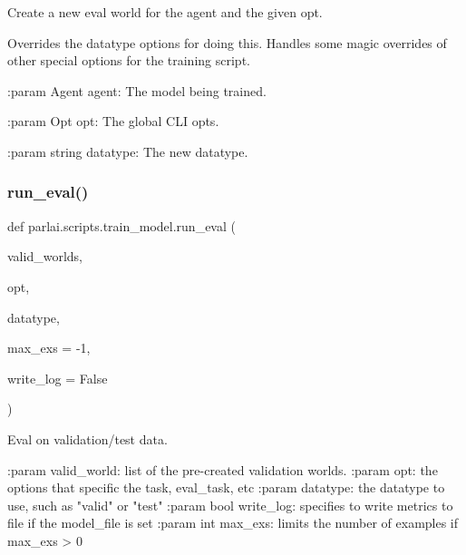 \begin{DoxyVerb}Create a new eval world for the agent and the given opt.

Overrides the datatype options for doing this.  Handles some magic
overrides of other special options for the training script.

:param Agent agent:
    The model being trained.

:param Opt opt:
    The global CLI opts.

:param string datatype:
    The new datatype.
\end{DoxyVerb}
 \mbox{\label{namespaceparlai_1_1scripts_1_1train__model_a496dfe3bf04da9b55d261b4c8d6229a7}} 
\subsubsection{\texorpdfstring{run\+\_\+eval()}{run\_eval()}}
{\footnotesize\ttfamily def parlai.\+scripts.\+train\+\_\+model.\+run\+\_\+eval (\begin{DoxyParamCaption}\item[{}]{valid\+\_\+worlds,  }\item[{}]{opt,  }\item[{}]{datatype,  }\item[{}]{max\+\_\+exs = {\ttfamily -\/1},  }\item[{}]{write\+\_\+log = {\ttfamily False} }\end{DoxyParamCaption})}

\begin{DoxyVerb}Eval on validation/test data.

:param valid_world:
    list of the pre-created validation worlds.
:param opt:
    the options that specific the task, eval_task, etc
:param datatype:
    the datatype to use, such as "valid" or "test"
:param bool write_log:
    specifies to write metrics to file if the model_file is set
:param int max_exs:
    limits the number of examples if max_exs > 0
\end{DoxyVerb}
 \mbox{\label{namespaceparlai_1_1scripts_1_1train__model_a5130cce2fb2a33694a2537d800ad9e9e}} 
